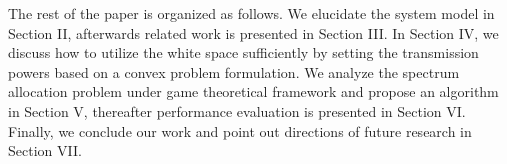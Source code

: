\documentclass[times]{ettauth}
\newcommand{\ie}{i.e., }
\theoremstyle{mytheoremstyle}
\theoremstyle{mytheoremstyle}
\theoremstyle{mytheoremstyle}
\begin{document}



The rest of the paper is organized as follows. 
We elucidate the system model in Section II, afterwards related work is presented in Section III. 
In Section IV, we discuss how to utilize the white space sufficiently by setting the transmission powers based on a convex problem formulation. 
We analyze the spectrum allocation problem under game theoretical framework and propose an algorithm in Section V, thereafter performance evaluation is presented in Section VI. Finally, we conclude our work and point out directions of future research in Section VII.
\end{document}
